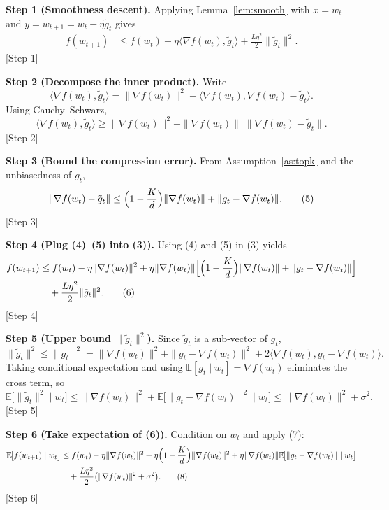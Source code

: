 \documentclass{article}
\newcommand{\E}{\mathbb{E}}
\begin{document}
\noindent\textbf{Step 1 (Smoothness descent).}  
Applying Lemma~\ref{lem:smooth} with $x=w_{t}$ and $y=w_{t+1}=w_{t}-\eta\tilde g_{t}$ gives
\begin{align}
f(w_{t+1})
&\le f(w_{t})-\eta\langle\nabla f(w_{t}),\tilde g_{t}\rangle
   +\frac{L\eta^{2}}{2}\|\tilde g_{t}\|^{2}. \tag{3}
\end{align}
[Step 1]

\noindent\textbf{Step 2 (Decompose the inner product).}  
Write
\[
\langle\nabla f(w_{t}),\tilde g_{t}\rangle
= \|\nabla f(w_{t})\|^{2}
   -\langle\nabla f(w_{t}),\nabla f(w_{t})-\tilde g_{t}\rangle.
\]
Using Cauchy–Schwarz,
\[
\langle\nabla f(w_{t}),\tilde g_{t}\rangle
\ge \|\nabla f(w_{t})\|^{2}
   -\|\nabla f(w_{t})\|\;\|\nabla f(w_{t})-\tilde g_{t}\|. \tag{4}
\]
[Step 2]

\noindent\textbf{Step 3 (Bound the compression error).}  
From Assumption~\ref{as:topk} and the unbiasedness of $g_{t}$,
\[
\|\nabla f(w_{t})-\tilde g_{t}\|
\le\Bigl(1-\frac{K}{d}\Bigr)\|\nabla f(w_{t})\|
    +\|g_{t}-\nabla f(w_{t})\|. \tag{5}
\]
[Step 3]

\noindent\textbf{Step 4 (Plug (4)–(5) into (3)).}  
Using (4) and (5) in (3) yields
\begin{align}
f(w_{t+1})
&\le f(w_{t})-\eta\|\nabla f(w_{t})\|^{2}
   +\eta\|\nabla f(w_{t})\|
      \Bigl[\Bigl(1-\frac{K}{d}\Bigr)\|\nabla f(w_{t})\|
            +\|g_{t}-\nabla f(w_{t})\|\Bigr] \nonumber\\
&\quad+\frac{L\eta^{2}}{2}\|\tilde g_{t}\|^{2}. \tag{6}
\end{align}
[Step 4]

\noindent\textbf{Step 5 (Upper bound $\|\tilde g_{t}\|^{2}$).}  
Since $\tilde g_{t}$ is a sub‑vector of $g_{t}$,
\[
\|\tilde g_{t}\|^{2}\le\|g_{t}\|^{2}
   =\|\nabla f(w_{t})\|^{2}
    +\|g_{t}-\nabla f(w_{t})\|^{2}
    +2\langle\nabla f(w_{t}),g_{t}-\nabla f(w_{t})\rangle.
\]
Taking conditional expectation and using $\E[g_{t}\mid w_{t}]=\nabla f(w_{t})$ eliminates the cross term, so
\[
\E\big[\|\tilde g_{t}\|^{2}\mid w_{t}\big]
\le \|\nabla f(w_{t})\|^{2}+ \E\big[\|g_{t}-\nabla f(w_{t})\|^{2}\mid w_{t}\big]
\le \|\nabla f(w_{t})\|^{2}+ \sigma^{2}. \tag{7}
\]
[Step 5]

\noindent\textbf{Step 6 (Take expectation of (6)).}  
Condition on $w_{t}$ and apply (7):
\begin{align}
\E\!\big[f(w_{t+1})\mid w_{t}\big]
&\le f(w_{t})-\eta\|\nabla f(w_{t})\|^{2}
   +\eta\Bigl(1-\frac{K}{d}\Bigr)\|\nabla f(w_{t})\|^{2}
   +\eta\|\nabla f(w_{t})\|\E\!\big[\|g_{t}-\nabla f(w_{t})\|\mid w_{t}\big] \nonumber\\
&\quad+\frac{L\eta^{2}}{2}\big(\|\nabla f(w_{t})\|^{2}+\sigma^{2}\big). \tag{8}
\end{align}
[Step 6]
\end{document}

